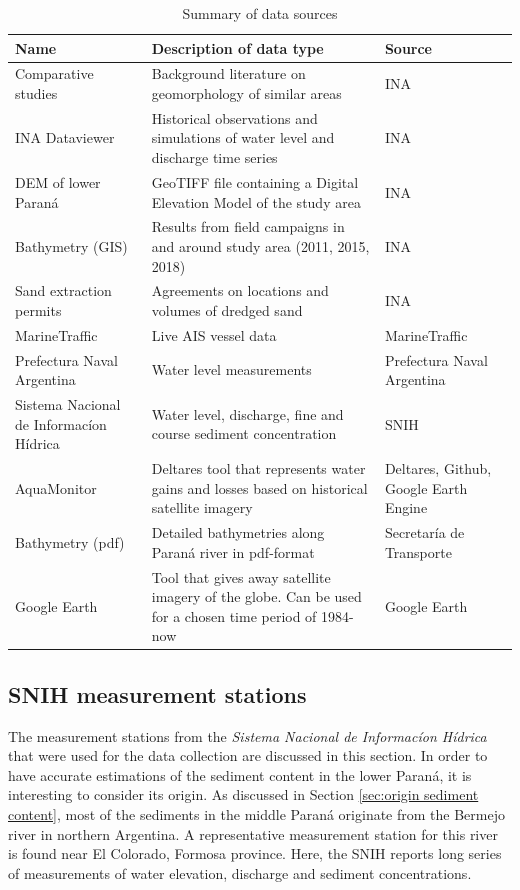 \begin{table}[H]
    \centering
    \renewcommand{\arraystretch}{1.2} %
    \setlength{\tabcolsep}{4pt}       %
    \begin{tabularx}{\textwidth}{p{3.5cm}p{8cm}p{3.5cm}}
        \toprule
        Name & Description of data type & Source \\
        \midrule
        Comparative studies  & Background literature on geomorphology of similar areas & INA   \\
        INA Dataviewer         & Historical observations and simulations of water level and discharge time series & INA  \\
        DEM of lower Paraná & GeoTIFF file containing a Digital Elevation Model of the study area & INA \\
        Bathymetry (GIS) & Results from field campaigns in and around study area (2011, 2015, 2018) & INA \\
        Sand extraction permits & Agreements on locations and volumes of dredged sand & INA \\
        MarineTraffic & Live AIS vessel data & MarineTraffic \\
        Prefectura Naval Argentina  & Water level measurements & Prefectura Naval Argentina   \\
        Sistema Nacional de Informacíon Hídrica & Water level, discharge, fine and course sediment concentration & SNIH \\
        AquaMonitor & Deltares tool that represents water gains and losses based on historical satellite imagery & Deltares, Github, Google Earth Engine \\
        Bathymetry (pdf) & Detailed bathymetries along Paraná river in pdf-format & Secretaría de Transporte \\
        Google Earth & Tool that gives away satellite imagery of the globe. Can be used for a chosen time period of 1984-now & Google Earth  \\
        \bottomrule
    \end{tabularx}
    \caption{Summary of data sources}
    \label{tab:data collection summary}
\end{table}

\subsection{SNIH measurement stations}
\label{sec:measurementstations}
The measurement stations from the \textit{Sistema Nacional de Informacíon Hídrica} that were used for the data collection are discussed in this section. In order to have accurate estimations of the sediment content in the lower Paraná, it is interesting to consider its origin. As discussed in Section \ref{sec:origin sediment content}, most of the sediments in the middle Paraná originate from the Bermejo river in northern Argentina. A representative measurement station for this river is found near El Colorado, Formosa province. Here, the SNIH reports long series of measurements of water elevation, discharge and sediment concentrations.

